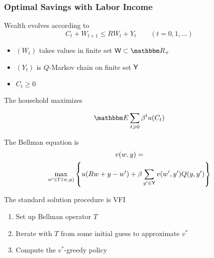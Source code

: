\begin{frame}
    \frametitle{Optimal Savings with Labor Income}

    
    Wealth evolves according to
    \begin{equation*}
        C_t + W_{t+1} \leq R W_t + Y_t 
        \qquad (t = 0, 1, \ldots)
    \end{equation*}

        \vspace{0.5em}
    \begin{itemize}
        \item $(W_t)$ takes values in finite set $\Wsf \subset \RR_+$ 
        \vspace{0.5em}
        \item $(Y_t)$ is $Q$-Markov chain on finite set $\mathsf Y$ 
        \vspace{0.5em}
        \item $C_t \geq 0$
    \end{itemize}

        \vspace{0.5em}
    The household maximizes

    \begin{equation*}
        \EE \sum_{t \geq 0} \beta^t u(C_t)
    \end{equation*}


\end{frame}

\begin{frame}
    
    The Bellman equation is
    \begin{multline*}
        v(w, y) = 
        \\
        \max_{w' \in \Gamma(w, y)}
        \left\{
            u(R w + y - w')
            + \beta \sum_{y' \in \mathsf Y} v(w', y') Q(y, y')
        \right\}
    \end{multline*}

        \vspace{0.5em}
        \vspace{0.5em}
    The standard solution procedure is VFI

    \begin{enumerate}
        \item Set up Bellman operator $T$
        \vspace{0.5em}
        \item Iterate with $T$ from some initial guess to approximate $v^*$
        \vspace{0.5em}
        \item Compute the $v^*$-greedy policy
    \end{enumerate}

\end{frame}



